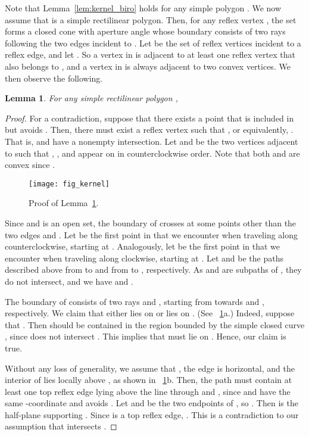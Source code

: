 \documentclass[11pt]{article}
\newtheorem{lemma}{Lemma}
\theoremstyle{definition}
\begin{document}
Note that Lemma~\ref{lem:kernel_biro} holds for any simple polygon .
We now assume that  is a simple rectilinear polygon.
Then, for any reflex vertex , the set  forms a closed cone with aperture angle 
whose boundary consists of two rays following the two edges incident to .
Let  be the set of reflex vertices incident to a reflex edge,
and let .
So a vertex in  is adjacent to at least one reflex vertex that also belongs to ,
and a vertex in  is always adjacent to two convex vertices.
We then observe the following.
\begin{lemma}
\label{lem:kernel_lem}
For any simple rectilinear polygon ,

\end{lemma}
\begin{proof}
For a contradiction, suppose that there exists a point  that is included in
 but avoids .
Then, there must exist a reflex vertex  such that ,
or equivalently, .
That is,  and  have a nonempty intersection.
Let  and  be the two vertices adjacent to  such that , , and  appear
on  in counterclockwise order.
Note that both  and  are convex since .


\begin{figure}[tb]
\centering
\texttt{[image: fig\_kernel]}
\caption{Proof of Lemma~\ref{lem:kernel_lem}.}
\label{fig:kernel}
\end{figure}

Since  and  is an open set,
the boundary  of  crosses  at some points other than the two edges  and .
Let  be the first point in 
that we encounter when traveling along  counterclockwise, starting at .
Analogously, let  be the first point in 
that we encounter when traveling along  clockwise, starting at .
Let  and  be the paths described above
from  to  and from  to , respectively.
As   and  are subpaths of , they do not intersect,
and we have  and .

The boundary  of  consists of two rays  and ,
starting from  towards  and , respectively.
We claim that either  lies on  or  lies on .
(See \figurename~\ref{fig:kernel}a.) 
Indeed, suppose that .
Then  should be contained in the region bounded by the simple closed curve
, since  does not intersect .
This implies that  must lie on .
Hence, our claim is true.

Without any loss of generality, we assume that ,
the edge  is horizontal, and the interior of  lies locally above ,
as shown in \figurename~\ref{fig:kernel}b.
Then, the path  must contain at least one top reflex edge  lying above
the line through  and ,
since  and  have the same -coordinate and  avoids .
Let  and  be the two endpoints of ,
so .
Then  is the half-plane  supporting .
Since  is a top reflex edge, .
This is a contradiction to our assumption that  intersects .
\end{proof}
\end{document}
